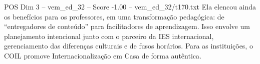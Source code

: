 \begin{textsample}{POS Dim 3 – vem\_ed\_32 – Score -1.00 – vem\_ed\_32/t170.txt}
Ela elencou ainda os benefícios para os professores, em uma transformação pedagógica: de “entregadores de conteúdo” para facilitadores de aprendizagem.
Isso envolve um planejamento intencional junto com o parceiro da IES internacional, gerenciamento das diferenças culturais e de fusos horários.
Para as instituições, o COIL promove Internacionalização em Casa de forma autêntica.

\end{textsample}
